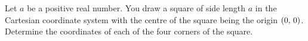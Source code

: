\documentclass[a4paper,oneside,12pt]{article}
\begin{document}
\begin{problem}
\item\label{prob:square_centre_origin}
  Let $a$ be a positive real number.  You draw a square of side length
  $a$ in the Cartesian coordinate system with the centre of the square
  being the origin $\left\lparen{0},\, {0}\right\rparen$.  Determine the coordinates of each
  of the four corners of the square.


\end{problem}
\end{document}
